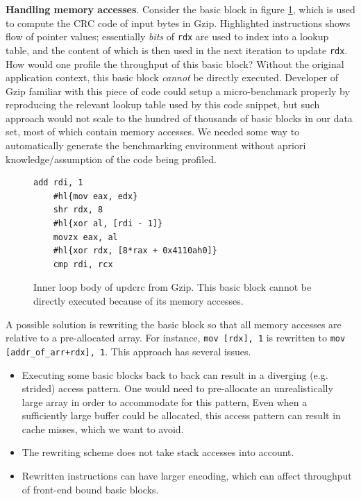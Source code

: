 \textbf{Handling memory accesses}.
Consider the basic block in figure \ref{fig:mem-ex},
which is used to compute the CRC code of input bytes in Gzip.
Highlighted instructions shows flow of pointer values;
essentially \textit{bits} of \verb|rdx| are used to index into a lookup table, 
and the content of which is then used in the next iteration to 
update \verb|rdx|.
How would one profile the throughput of this basic block?
Without the original application context,
this basic block \textit{cannot} be directly executed.
Developer of Gzip familiar with this piece of code could 
setup a micro-benchmark properly by reproducing the
relevant lookup table used by this code snippet,
but such approach would not scale to the hundred of 
thousands of basic blocks in our data set, most of which contain memory accesses.
We needed some way to automatically generate the benchmarking environment
without apriori knowledge/assumption of the code being profiled.

\begin{figure}[h]
\begin{Verbatim}[commandchars=\#\{\}]
    add rdi, 1
    #hl{mov eax, edx}
    shr rdx, 8
    #hl{xor al, [rdi - 1]}
    movzx eax, al
    #hl{xor rdx, [8*rax + 0x4110ah0]}
    cmp rdi, rcx
\end{Verbatim}
\caption{Inner loop body of updcrc from Gzip.
This basic block cannot be directly executed because
of its memory accesses.}
\label{fig:mem-ex}
\end{figure}

A possible solution\cite{ithemal} is rewriting
the basic block so that all memory accesses are
relative to a pre-allocated array.
For instance, \verb|mov [rdx], 1| is rewritten to
\verb|mov [addr_of_arr+rdx], 1|. 
This approach has several issues.
\begin{itemize}
    \item Executing some basic blocks back to back can result in a 
    diverging (e.g. strided) access pattern. 
    One would need to pre-allocate an unrealistically large array
    in order to  accommodate for this pattern, 
    Even when a sufficiently large buffer could be allocated,
    this access pattern can result in cache misses, 
    which we want to avoid.
    \item The rewriting scheme does not take stack accesses
    into account.
    \item Rewritten instructions can
    have larger encoding, which can affect throughput
    of front-end bound basic blocks.
\end{itemize}


